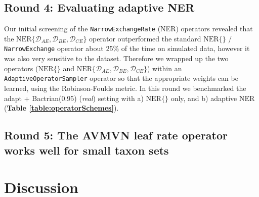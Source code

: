 \documentclass[10pt,letterpaper]{article}
\begin{document}
\subsection*{Round 4: Evaluating adaptive NER}


Our initial screening of the \texttt{NarrowExchangeRate} (NER) operators revealed that the $\text{NER}\{\mathcal{D}_{AE}, \mathcal{D}_{BE}, \mathcal{D}_{CE}\}$ operator outperformed the standard $\text{NER} \{\}$ / \texttt{NarrowExchange} operator about 25\% of the time on simulated data, however it was also very sensitive to the dataset. 
Therefore we wrapped up the two operators ($\text{NER} \{\}$ and $\text{NER}\{\mathcal{D}_{AE}, \mathcal{D}_{BE}, \mathcal{D}_{CE}\}$) within an \texttt{AdaptiveOperatorSampler} operator so that the appropriate weights can be learned, using the Robinson-Foulds metric.
In this round we benchmarked the adapt + Bactrian(0.95) (\textit{real})  setting with a) $\text{NER} \{\}$ only, and b) adaptive $\text{NER}$ (\textbf{Table \ref{table:operatorSchemes}}).







\subsection*{Round 5: The AVMVN leaf rate operator works well for small taxon sets}





\section*{Discussion} \label{sect:discussion}



\end{document}
